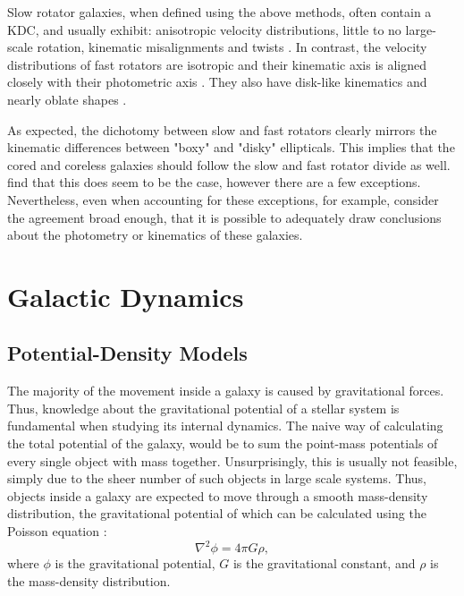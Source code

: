 \documentclass[english, oneside]{HYgradu}
\begin{document}
Slow rotator galaxies, when defined using the above methods, often contain a KDC, and usually exhibit: anisotropic velocity distributions, little to no large-scale rotation, kinematic misalignments and twists \citep{Emsellem2007, Cappellari2007}. In contrast, the velocity distributions of fast rotators are isotropic and their kinematic axis is aligned closely with their photometric axis \citep{Emsellem2007}. They also have disk-like kinematics and nearly oblate shapes \citep{Cappellari2007}. 

As expected, the dichotomy between slow and fast rotators clearly mirrors the kinematic differences between "boxy" and "disky" ellipticals. This implies that the cored and coreless galaxies should follow the slow and fast rotator divide as well. \cite{Krajnovic2013} find that this does seem to be the case, however there are a few exceptions. Nevertheless, even when accounting for these exceptions, \cite{Cappellari2016} for example, consider the agreement broad enough, that it is possible to adequately draw conclusions about the photometry or kinematics of these galaxies.

\section{Galactic Dynamics}

\subsection{Potential-Density Models}

The majority of the movement inside a galaxy is caused by gravitational forces. Thus, knowledge about the gravitational potential of a stellar system is fundamental when studying its internal dynamics. The naive way of calculating the total potential of the galaxy, would be to sum the point-mass potentials of every single object with mass together. Unsurprisingly, this is usually not feasible, simply due to the sheer number of such objects in large scale systems. Thus, objects inside a galaxy are expected to move through a smooth mass-density distribution, the gravitational potential of which can be calculated using the Poisson equation \citep{BinneyTremaine}:
\begin{equation}
\nabla^2 \phi = 4 \pi G \rho, \label{eq:poisson}
\end{equation}
where $\phi$ is the gravitational potential, $G$ is the gravitational constant, and $\rho$ is the mass-density distribution.
\end{document}
